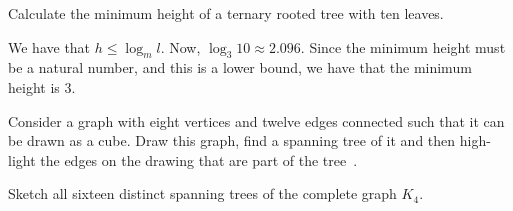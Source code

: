\documentclass[addpoints,12pt]{exam}
\begin{document}
\begin{questions}
\question
Calculate the minimum height of a ternary rooted tree with ten leaves.
\begin{solution}
We have that $h \leq  \log_m l$.
Now, $\log_3 10 \approx 2.096$.
Since the minimum height must be a natural number, and this is a lower bound, we have that the minimum height is 3.
\end{solution}

\question
Consider a graph with eight vertices and twelve edges connected such that it can be drawn as a cube.
Draw this graph, find a spanning tree of it and then high-light the edges on the drawing that are part of the tree~\cite{biggs02}.

\question
Sketch all sixteen distinct spanning trees of the complete graph $K_4$.





\end{questions}



\end{document}
